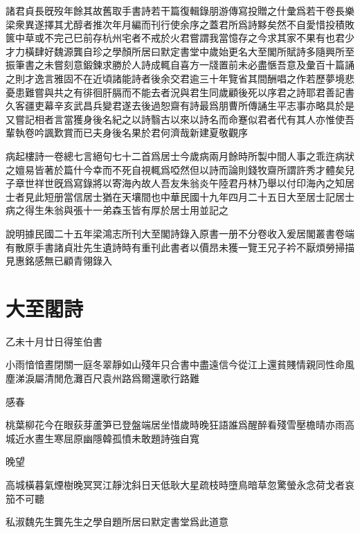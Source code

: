 \documentclass{zhvt-classic-Miya}
\begin{document}
\begin{fw}\end{fw}
諸君貞長旣歿年餘其故舊取手書詩若干篇復輯錄朋游傳寫投贈之什彙爲若干卷長樂梁衆異遂擇其尤醇者推次年月編而刊行使余序之蓋君所爲詩黟矣然不自愛惜投積敗篋中草或不完己巳前存杭州宅者不戒於火君嘗謂我當憶存之今求其家不果有也君少才力橫肆好魏源龔自珍之學顏所居曰默定書堂中歲始更名大至閣所賦詩多隨興所至振筆書之未嘗刻意鍛鍊求勝於人詩成輒自喜方一牋置前未必盡愜吾意及彙百十篇誦之則才逸言雅固不在近頃諸能詩者後余交君逾三十年覽省其間酬唱之作若歷夢境悲憂患難嘗與共之有徘徊肝膈而不能去者況與君生同歲顧後死以序君之詩耶君善記書久客疆吏幕辛亥武昌兵變君遂去後過恕齋有詩最爲朋曹所傳誦生平志事亦略具於是又嘗記相者言當獲身後名紀之以詩翳古以來以詩名而命蹇似君者代有其人亦惟使吾輩執卷吟諷歎賞而已夫身後名果於君何濟哉新建夏敬觀序
\begin{fw}\end{fw}
病起樓詩一卷總七言絕句七十二首爲居士今歲病兩月餘時所製中間人事之乖迕病狀之嬗易皆著於篇什今幸而不死自視輒爲啞然但以詩而論則錢牧齋所謂許秀才體矣兒子章世祥世旣爲寫錄將以寄海內故人吾友朱翁炎午陸君丹林乃舉以付印海內之知居士者見此短册當信居士猶在天壤間也中華民國十九年四月二十五日大至居士記居士病之得生朱翁與張十一弟森玉皆有厚於居士用並記之
\begin{fw}\end{fw}
說明據民國二十五年梁鴻志所刊大至閣詩錄入原書一册不分卷收入爰居閣叢書卷端有散原手書諸貞壯先生遺詩時有重刊此書者以價昂未獲一覽王兄子衿不厭煩勞掃描見惠銘感無已顧青翎錄入
\chapter*{大至閣詩}


\begin{fw}乙未十月廿日得笙伯書\end{fw}

小雨愔愔晝閉關一庭冬翠靜如山殘年只合書中盡遠信今從江上還貧賤情親同性命風塵涕淚屬清閒危灘百尺袁州路爲爾還歌行路難

\begin{fw}感春\end{fw}

桃葉柳花今在眼荻芽蘆笋已登盤端居坐惜歲時晚狂語誰爲醒醉看殘雪壓檐晴亦雨高城近水晝生寒屈原幽隱韓孤憤未敢題詩強自寬

\begin{fw}晚望\end{fw}

高城橫暮氣煙樹晚冥冥江靜沈斜日天低耿大星疏枝時墮鳥暗草忽驚螢永念荷戈者哀笳不可聽

\begin{fw}私淑魏先生龔先生之學自題所居曰默定書堂爲此道意\end{fw}
\end{document}
